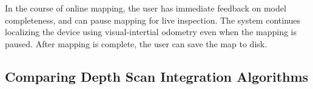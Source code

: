 \documentclass[10pt,twocolumn,letterpaper]{article}
\begin{document}
In the course of online mapping, the user has immediate feedback on model
completeness, and can pause mapping for live inspection. The system continues
localizing the device using visual-intertial odometry even when the mapping is
paused. After mapping is complete, the user can save the map to disk.
 
\subsection{Comparing Depth Scan Integration Algorithms} 
\end{document}
